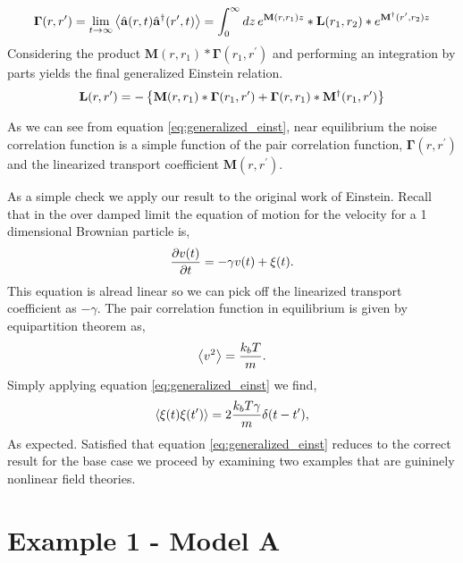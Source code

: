 %
\begin{equation}
    \mathbf{\Gamma}(r, r^\prime) = \lim_{t\rightarrow\infty}
    \left\langle \hat{\mathbf{a}}(r, t)\hat{\mathbf{a}}^\dagger(r^\prime, t) \right\rangle
    = \int_0^\infty dz \,e^{\mathbf{M}(r, r_1)z}\ast\mathbf{L}(r_1, r_2)\ast
    e^{\mathbf{M}^\dagger(r^\prime, r_2)z}
\end{equation}
%
Considering the product $\mathbf{M}(r, r_1)\ast\mathbf{\Gamma}(r_1, r^\prime)$
and performing an integration by parts yields the final generalized Einstein
relation.
%
\begin{equation}
    \label{eq:generalized_einst} 
    \mathbf{L}(r, r^\prime) = - \left\lbrace
          \mathbf{M}(r, r_1) 
     \ast \mathbf{\Gamma}(r_1, r^\prime) 
        + \mathbf{\Gamma}(r, r_1)
     \ast \mathbf{M}^\dagger(r_1, r^\prime) \right\rbrace
\end{equation}
%

As we can see from equation \ref{eq:generalized_einst}, near equilibrium the
noise correlation function is a simple function of the pair correlation
function, $\mathbf{\Gamma}(r, r^\prime)$ and the linearized transport
coefficient $\mathbf{M}(r, r^\prime)$.

As a simple check we apply our result to the original work of Einstein. Recall
that in the over damped limit the equation of motion for the velocity for a 1
dimensional Brownian particle is,
%
\begin{equation}
    \frac{\partial v(t)}{\partial t} = -\gamma v (t) + \xi(t).
\end{equation}
%
This equation is alread linear so we can pick off the linearized transport
coefficient as $-\gamma$. The pair correlation function in equilibrium is given
by equipartition theorem as,
%
\begin{equation}
    \left\langle v^2 \right\rangle = \frac{k_b T}{m}.
\end{equation}
%
Simply applying equation \ref{eq:generalized_einst} we find,
%
\begin{equation}
    \left\langle \xi(t)\xi(t^\prime) \right\rangle = 2 \frac{k_b T \gamma}{m} \delta(t - t^\prime),
\end{equation}
%
As expected. Satisfied that equation \ref{eq:generalized_einst} reduces to 
the correct result for the base case we proceed by examining two examples
that are guininely nonlinear field theories.

\section{Example 1 - Model A} %

